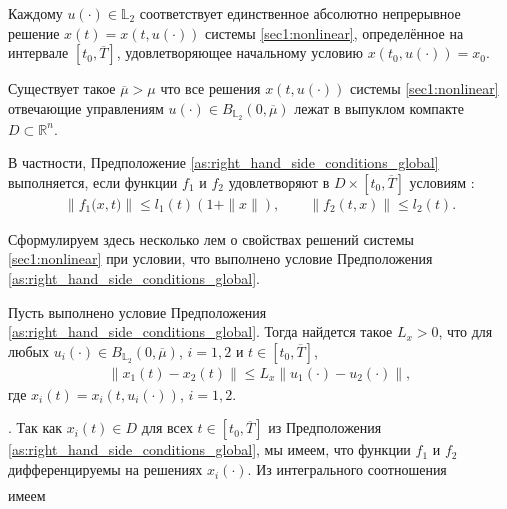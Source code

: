 \documentclass[../main.tex]{subfiles}
\begin{document}
	Каждому $ u(\cdot) \in \mathbb{L}_2 $ соответствует единственное абсолютно непрерывное решение $ x(t)=x(t,u(\cdot)) $ системы \eqref{sec1:nonlinear}, определённое на интервале $ [t_0,\overline{T}] $, удовлетворяющее начальному условию $ x(t_0, u(\cdot)) = x_0$.
	

	\begin{assumption}\label{as:right_hand_side_conditions_global}
		Существует такое $\overline{\mu} > \mu $ что все решения $ x(t, u(\cdot)) $ системы \eqref{sec1:nonlinear} отвечающие управлениям $u(\cdot) \in B_{\mathbb{L}_2}(0,\overline{\mu})$  лежат в выпуклом компакте $D \subset \mathbb{R}^n$.
	\end{assumption}

	В частности, Предположение \ref{as:right_hand_side_conditions_global} выполняется, если  функции $f_1$ и $f_2$ удовлетворяют в $D \times [t_0, \overline{T}]$ условиям \cite[теорема 5]{Fillipov2}:
	\begin{gather}
		\left\|f_1\big(x,t\big) \right\| \leqslant l_1(t) (1 + \|x\|), \qquad  \left\| f_2(t,x) \right\| \leqslant l_2(t). 
	\end{gather}

	Сформулируем здесь несколько лем о свойствах решений системы \eqref{sec1:nonlinear} при условии, что выполнено условие Предположения \ref{as:right_hand_side_conditions_global}.
	
	\begin{lemma}\label{lem:Lip_of_solutions_global}
			Пусть выполнено условие Предположения \ref{as:right_hand_side_conditions_global}. Тогда найдется такое $L_x > 0$, что для любых $u_i(\cdot) \in B_{\mathbb{L}_2}(0,\overline{\mu}) $, $i = 1,2$ и $t \in [t_0, \overline{T}]$, 
			\begin{gather}
			\left\| x_1(t) - x_2(t) \right\| \leqslant L_x \left\|u_1(\cdot) - u_2(\cdot) \right\|, 
			\end{gather}
		где $x_i(t) = x_i(t,u_i(\cdot))$, $i = 1,2$. 
	\end{lemma}
	\doc. 
	Так как $x_i(t) \in D$ для всех $t\in [t_0,\overline{T}]$ из Предположения \ref{as:right_hand_side_conditions_global}, мы имеем, что функции $f_1$ и $f_2$ дифференцируемы на решениях $x_i(\cdot)$. Из интегрального соотношения
	\begin{gather*}
	\end{gather*}
	имеем
	
\end{document}
